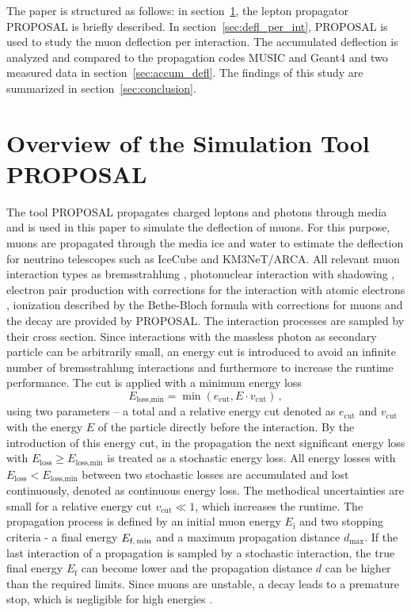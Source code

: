 \documentclass[pdflatex, sn-mathphys]{sn-jnl}%
\theoremstyle{thmstyleone}%
\theoremstyle{thmstyletwo}%
\theoremstyle{thmstylethree}%
\begin{document}
The paper is structured as follows: in section~\ref{sec:proposal},
the lepton propagator PROPOSAL is briefly described. In section~\ref{sec:defl_per_int},
PROPOSAL is used to study the muon deflection per interaction.
The accumulated deflection is analyzed and compared to the propagation codes
MUSIC and Geant4 and two measured data in section~\ref{sec:accum_defl}. The findings of this study
are summarized in section~\ref{sec:conclusion}.

\section{Overview of the Simulation Tool PROPOSAL}\label{sec:proposal}

The tool PROPOSAL \cite{koehne2013proposal, dunsch_2018_proposal_improvements} propagates charged leptons and photons through media and is 
used in this paper to simulate the deflection of muons. For this purpose, 
muons are propagated through the media ice and water 
to estimate the deflection for neutrino telescopes such as IceCube and KM3NeT/ARCA. All relevant muon interaction types 
as bremsstrahlung \cite{KKP_1995, Bremsstrahlung_KKP}, photonuclear interaction \cite{Abramowicz_1997} with 
shadowing \cite{ButkevichMikheyev_2002}, electron pair production \cite{epair_kokoulin_petrukhin} with corrections for the 
interaction with atomic electrons \cite{epair_kelner}, 
ionization described by the Bethe-Bloch formula with corrections for muons \cite{Rossi} 
and the decay are provided by PROPOSAL. The interaction processes are sampled by their cross section.
Since interactions 
with the massless photon as secondary particle can be arbitrarily small, an energy cut is introduced to avoid an infinite number of bremsstrahlung interactions 
and furthermore to increase the runtime performance. 
The cut is applied with a minimum energy loss
\begin{equation}
    E_{\text{loss,min}} = \min{(e_{\mathrm{cut}}, E \cdot v_{\mathrm{cut}})}\,,
\end{equation}
using two parameters -- a total and a relative energy cut denoted as 
$e_{\mathrm{cut}}$ and $v_{\mathrm{cut}}$ with the energy $E$ of the particle 
directly before the interaction. 
By the introduction of 
this energy cut, in the propagation the next significant energy loss with 
$E_{\mathrm{loss}} \geq E_{\text{loss,min}}$ 
is treated as a stochastic energy loss. 
All energy losses with $E_{\mathrm{loss}} < E_{\text{loss,min}}$ between 
two stochastic losses are accumulated and lost continuously, denoted 
as continuous energy loss.
The methodical uncertainties are small 
for a relative energy cut $v_{\mathrm{cut}}\ll 1$, which increases the runtime.
The 
propagation process is defined by an initial muon energy $E_{\text{i}}$ and 
two stopping criteria - a final energy $E_{\text{f,\,min}}$ and a 
maximum propagation distance $d_{\text{max}}$. If the last interaction of 
a propagation is sampled by a stochastic interaction, the true final energy 
$E_{\text{f}}$ can become lower and the 
propagation distance $d$ can be higher than the required limits. 
Since muons are unstable, a decay leads to a premature 
stop, which is negligible for high energies \cite{phd_soedingrekso}.
\end{document}
